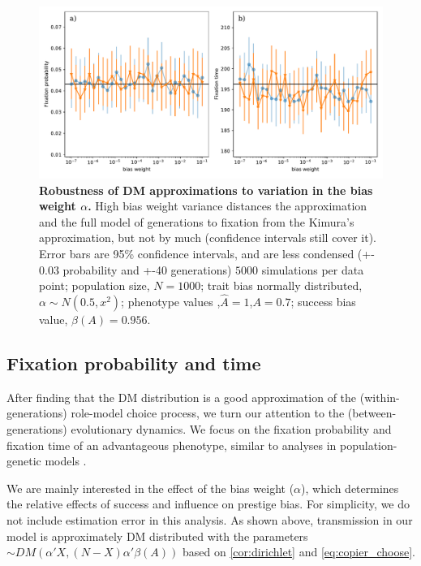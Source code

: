 \documentclass[12pt]{extarticle}
\begin{document}
\begin{figure}
    \includegraphics[width=\linewidth]{../figures/binary/full_vs_dm_changing_alpha.pdf}
   \caption{\textbf{Robustness of DM approximations to variation in the bias weight $\alpha$.} 
   High bias weight variance distances the approximation and the full model of generations to fixation from the Kimura's approximation, but not by much (confidence intervals still cover it). Error bars are 95\% confidence intervals, and are less condensed (+- 0.03 probability and +-40 generations)
  $5000$ simulations per data point; population size, $N=1000$; trait bias normally distributed, $\alpha\sim N(0.5,x^2)$; phenotype values ,$\hat{A}=1$,$A=0.7$; success bias value, $\beta(A)=0.956$.}	
  \label{fig:hetro_alpha}
\end{figure}


\subsection*{Fixation probability and time}

After finding that the DM distribution is a good approximation of the (within-generations) role-model choice process, we turn our attention to the (between-generations) evolutionary dynamics.
We focus on the fixation probability and fixation time of an advantageous phenotype, similar to analyses in population-genetic models \citep{kimura,kimura_average,otto_fixation}.

We are mainly interested in the effect of the bias weight ($\alpha$), which determines the relative effects of success and influence on prestige bias.
For simplicity, we do not include estimation error in this analysis.
As shown above, transmission in our model is approximately DM distributed with the parameters $\sim DM(\alpha'X,(N-X)\alpha'\beta(A))$ based on \cref{cor:dirichlet} and \cref{eq:copier_choose}.
\end{document}
